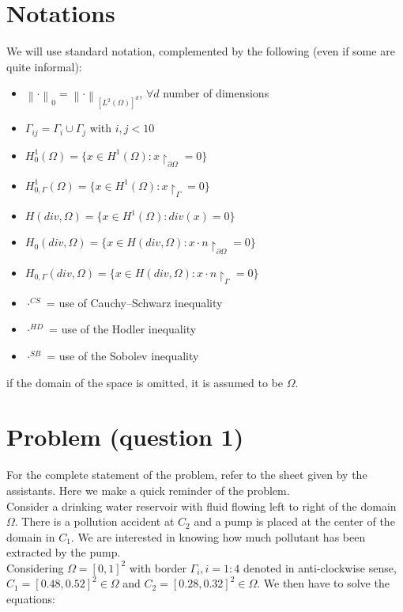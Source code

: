 \documentclass[conference]{IEEEtran}
\newcommand{\norm}[1]{\left\lVert#1\right\rVert}
\begin{document}
\section{Notations}
We will use standard notation, complemented by the following (even if some are quite informal):
\begin{itemize}
\item $\norm{\cdot}_0 = \norm{\cdot}_{[L^2(\Omega)]^d}$, $\forall d$ number of dimensions
\item $\Gamma_{ij} = \Gamma_i \cup \Gamma_j$    with $ i,j < 10$
\item $H^1_0(\Omega)= \{ x \in H^1(\Omega) : x{\restriction}_{\partial \Omega}=0 \}$
\item $H^1_{0,\Gamma}(\Omega)= \{ x \in H^1(\Omega) : x{\restriction}_{\Gamma}=0 \}$
\item $H(div,\Omega) = \{ x \in H^1(\Omega) : div(x) = 0\}$
\item $H_{0}(div,\Omega) = \{ x \in H(div,\Omega) : x\cdot n{\restriction}_{\partial \Omega} = 0\}$
\item $H_{0,\Gamma}(div,\Omega) = \{ x \in H(div,\Omega) : x\cdot n{\restriction}_\Gamma = 0\}$
\item $\cdot^{CS}$ = use of Cauchy–Schwarz inequality
\item $\cdot^{HD}$ = use of the Hodler inequality
\item $\cdot^{SB}$ = use of the Sobolev inequality
\end{itemize}
if the domain of the space is omitted, it is assumed to be $\Omega$.


\section{Problem (question 1)}
For the complete statement of the problem, refer to the sheet given by the assistants. Here we make a quick reminder of the problem.\\
Consider a drinking water reservoir with fluid flowing left to right of the domain $\Omega$. There is a pollution accident at $C_2$ and a pump is placed at the center of the domain in $C_1$. We are interested in knowing how much pollutant has been extracted by the pump. \\
Considering $\Omega = [0,1]^2$ with border $\Gamma_i , i=1:4$ denoted in anti-clockwise sense, $C_1 = [0.48,0.52]^2 \in \Omega$ and $C_2=[0.28,0.32]^2 \in \Omega$. We then have to solve the equations:
\end{document}
